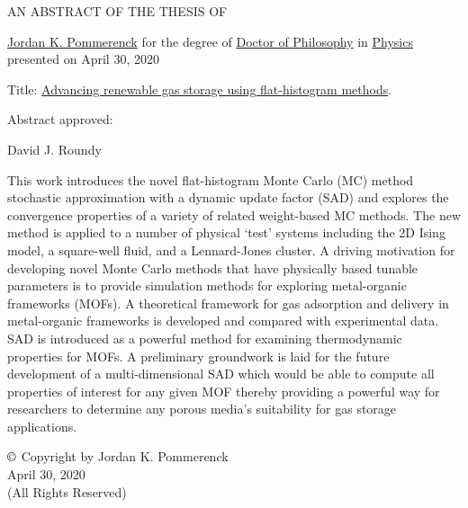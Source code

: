 \thispagestyle{empty}
\begin{center}
	\large
	AN ABSTRACT OF THE THESIS OF
\end{center}


\justify{}
\underline{Jordan K. Pommerenck} for the degree of \underline{Doctor of Philosophy} in \underline{Physics}
presented on April 30, 2020
\vspace{1.0cm}

\justify{}
Title: \underline{Advancing renewable gas storage using flat-histogram methods}.
\vspace{2.0cm}

\justify{}
Abstract approved:
\underline{\hspace{11cm}}
\vspace{0.5cm}

\hspace{7.0cm} David J. Roundy
\vspace{1.0cm}

\justify{}
\doublespacing
This work introduces the novel flat-histogram Monte
Carlo (MC) method stochastic approximation with a dynamic update factor (SAD) and explores the convergence properties of a
variety of related weight-based MC methods. The new method is applied
to a number of physical `test’ systems including the 2D Ising model, a
square-well fluid, and a Lennard-Jones cluster. A driving motivation for
developing novel Monte Carlo methods that have physically based tunable
parameters is to provide simulation methods for exploring metal-organic
frameworks (MOFs). A theoretical framework for gas adsorption and
delivery in metal-organic frameworks is developed and compared with
experimental data. SAD is introduced as a powerful method for examining
thermodynamic properties for MOFs. A preliminary groundwork is laid for
the future development of a multi-dimensional SAD which would be able
to compute all properties of interest for any given MOF thereby providing a powerful way for researchers to determine any porous media's suitability for gas storage applications.

\newpage{}
\thispagestyle{empty}
\singlespacing

\vspace*{4.0cm}
\begin{center}
$\copyright$ Copyright by Jordan K. Pommerenck \\
April 30, 2020 \\
(All Rights Reserved)
\end{center}

